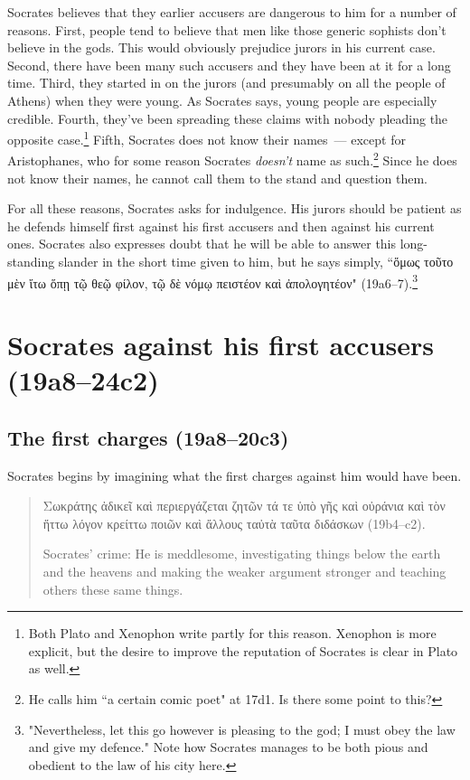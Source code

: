 \documentclass[11pt]{article}
\begin{document}
Socrates believes that they earlier accusers are dangerous to him for a number of reasons.  First, people tend to believe that men like those generic sophists don't believe in the gods.  This would obviously prejudice jurors in his current case.  Second, there have been many such accusers and they have been at it for a long time.  Third, they started in on the jurors (and presumably on all the people of Athens) when they were young.  As Socrates says, young people are especially credible.  Fourth, they've been spreading these claims with nobody pleading the opposite case.\footnote{Both Plato and Xenophon write partly for this reason.  Xenophon is more explicit, but the desire to improve the reputation of Socrates is clear in Plato as well.}  Fifth, Socrates does not know their names~--- except for Aristophanes, who for some reason Socrates \emph{doesn't} name as such.\footnote{He calls him ``a certain comic poet" at 17d1.  Is there some point to this?}  Since he does not know their names, he cannot call them to the stand and question them.

For all these reasons, Socrates asks for indulgence.  His jurors should be patient as he defends himself first against his first accusers and then against his current ones.  Socrates also expresses doubt that he will be able to answer this long-standing slander in the short time given to him, but he says simply, ``ὅμως τοῦτο μὲν ἴτω ὅπῃ τῷ θεῷ φίλον, τῷ δὲ νόμῳ πειστέον καὶ ἀπολογητέον" (19a6--7).\footnote{"Nevertheless, let this go however is pleasing to the god; I must obey the law and give my defence." Note how Socrates manages to be both pious and obedient to the law of his city here.}

\section{Socrates against his first accusers (19a8--24c2)}

\subsection{The first charges (19a8--20c3)}

Socrates begins by imagining what the first charges against him would have been.

\begin{quote}
    Σωκράτης ἀδικεῖ καὶ περιεργάζεται ζητῶν τά τε ὑπὸ γῆς καὶ οὐράνια καὶ τὸν ἥττω λόγον κρείττω ποιῶν καὶ ἄλλους ταὐτὰ ταῦτα διδάσκων (19b4--c2).

    Socrates' crime: He is meddlesome, investigating things below the earth and the heavens and making the weaker argument stronger and teaching others these same things.
\end{quote}
\end{document}
